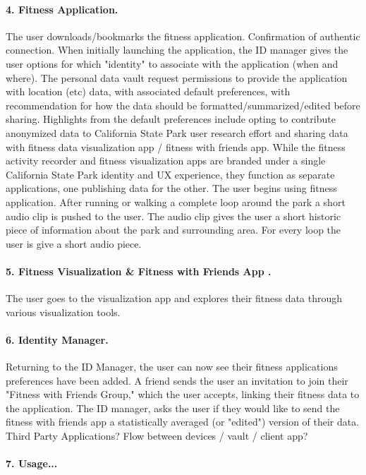 \paragraph*{4. Fitness Application.}  
The user downloads/bookmarks the fitness application. Confirmation of authentic connection. 
When initially launching the application, the ID manager gives the user options for which "identity" to associate with the application (when and where). The personal data vault request permissions to provide the application with location (etc) data, with associated default preferences, with recommendation for how the data should be formatted/summarized/edited before sharing. Highlights from the default preferences include opting to contribute anonymized data to California State Park user research effort and sharing data with fitness data visualization app / fitness with friends app. While the fitness activity recorder and fitness visualization apps are branded under a single California State Park identity and UX experience, they function as separate applications, one publishing data for the other. The user begins using fitness application. After running or walking a complete loop around the park a short audio clip is pushed to the user. The audio clip gives the user a short historic piece of information about the park and surrounding area. For every loop the user is give a short audio piece. 

\paragraph*{5. Fitness Visualization \& Fitness with Friends App .}
The user goes to the visualization app and explores their fitness data through various visualization tools.      

\paragraph*{6. Identity Manager.} 
Returning to the ID Manager, the user can now see their fitness applications preferences have been added.  A friend sends the user an invitation to join their "Fitness with Friends Group," which the user accepts, linking their fitness data to the application. The ID manager, asks the user if they would like to send the fitness with friends app a statistically averaged (or "edited") version of their data.    
Third Party Applications? Flow between devices / vault / client app? 

\paragraph*{7. Usage...} 

